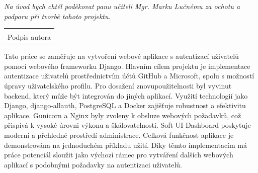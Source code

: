 \documentclass[12pt, a4paper,
twoside,        %
openright
]{report}
\newcommand\datumOdevzdani{1. 1. 2024} %
\begin{document}
\cleardoublepage %
	

	
	\noindent\textit{Na úvod bych chtěl poděkovat panu učiteli Mgr. Marku Lučnému za ochotu a podporu při tvorbě tohoto projektu.}
	
	\vspace*{0.7\textheight} %

	\vfill
	\noindent{V Opavě \datumOdevzdani\\}
	\noindent
	\begin{minipage}{\linewidth}
		\hspace{9.5cm} 
		\begin{tabular}{@{}p{6cm}@{}}
			\dotfill \\
			Podpis autora
		\end{tabular}
	\end{minipage}
	
	\cleardoublepage %


	\noindent Tato práce se zaměřuje na vytvoření webové aplikace s autentizací uživatelů pomocí webového frameworku Django. Hlavním cílem projektu je implementace autentizace uživatelů prostřednictvím účtů GitHub a Microsoft, spolu s možností úpravy uživatelského profilu. Pro dosažení znovupoužitelnosti byl vyvinut backend, který může být integrován do jiných aplikací. Využití technologií jako Django, django-allauth, PostgreSQL a Docker zajišťuje robustnost a efektivitu aplikace. Gunicorn a Nginx byly zvoleny k obsluze webových požadavků, což přispívá k vysoké úrovni výkonu a škálovatelnosti. Soft UI Dashboard poskytuje moderní a přehledné prostředí administrace. Celková funkčnost aplikace je demonstrována na jednoduchém příkladu užití. Díky těmto implementacím má práce potenciál sloužit jako výchozí rámec pro vytváření dalších webových aplikací s podobnými požadavky na autentizaci uživatelů.
	
\end{document}
